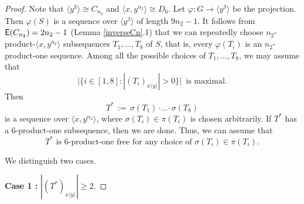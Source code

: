 \documentclass[leqno,a4paper]{amsart}
\def\E{{\sf E}}
\def\bd{{\boldsymbol{\cdot}}}
\theoremstyle{plain}
\theoremstyle{definition}
\numberwithin{equation}{section}
\begin{document}
	\begin{proof}Note that $\langle y^{3}\rangle\cong C_{n_2}$ and $\langle x, y^{n_2} \rangle\cong D_6$.
		Let $\varphi\colon G \to \langle y^{3}\rangle$ be the projection. Then $\varphi (S)$ is a sequence over $\langle y^{3}\rangle$ of length $9n_2 - 1$. It follows from $\E(C_{n_2})=2n_2-1$ (Lemma \ref{inverseCn}.1) that we can repeatedly choose $n_2$-product-$\langle x, y^{n_2} \rangle$ subsequences $T_1,\ldots, T_8$ of $S$, that is, every $\varphi(T_i)$ is an $n_2$-product-one sequence.
		Among all the possible  choices of $T_1,\ldots, T_8$, we may assume that
		\begin{equation}\label{maxi}
			\big| \{i\in [1,8]\colon |(T_i)_{x\langle y\rangle}|>0\} \big| \, \text{ is maximal}.
		\end{equation}
        Then
        \[
          T^* \, := \, \sigma(T_1)\,\bd\ldots\bd\, \sigma(T_8)
        \]
        is a sequence over $\langle x, y^{n_2} \rangle$, where $\sigma(T_i)\in \pi(T_i)$ is chosen arbitrarily.
		If $T^*$ has a $6$-product-one subsequence, then we are done. Thus, we can assume that
		\begin{equation}\label{6-free}
		\text{$T^*$ is $6$-product-one free for any choice of $\sigma (T_i)\in \pi (T_i)$.}
		\end{equation}
	

        We distinguish two cases.


		\smallskip
		\noindent
		{\bf Case 1 :} $|(T^{*})_{x \langle y \rangle}| \ge 2$.
		\smallskip
		


\end{proof}
\end{document}

